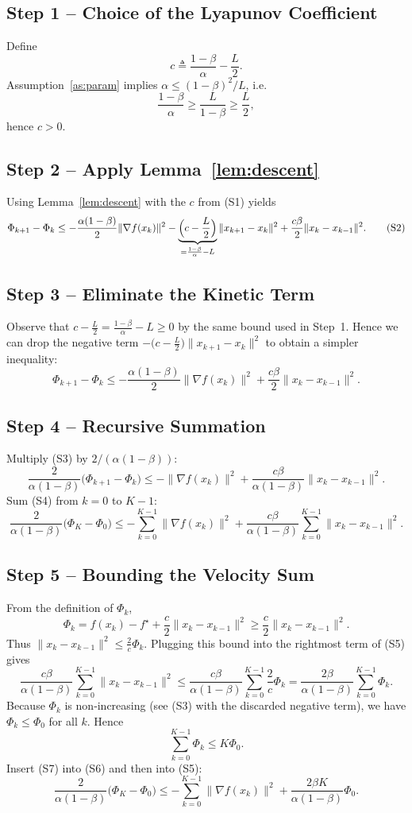 \documentclass{article}
\newcommand{\grad}{\nabla}
\begin{document}
\subsection*{Step 1 – Choice of the Lyapunov Coefficient}
Define
\[
c\triangleq\frac{1-\beta}{\alpha}-\frac{L}{2}.
\tag{S1}
\]
Assumption~\ref{as:param} implies $\alpha\le (1-\beta)^2/L$, i.e.
\[
\frac{1-\beta}{\alpha}\ge\frac{L}{1-\beta}\ge\frac{L}{2},
\]
hence $c>0$.

\subsection*{Step 2 – Apply Lemma~\ref{lem:descent}}
Using Lemma~\ref{lem:descent} with the $c$ from (S1) yields
\[
\Phi_{k+1}-\Phi_k
\le -\frac{\alpha(1-\beta)}{2}\|\grad f(x_k)\|^2
-\underbrace{\Bigl(c-\frac{L}{2}\Bigr)}_{=\frac{1-\beta}{\alpha}-L}\|x_{k+1}-x_k\|^2
+\frac{c\beta}{2}\|x_k-x_{k-1}\|^2 .
\tag{S2}
\]

\subsection*{Step 3 – Eliminate the Kinetic Term}
Observe that $c-\frac{L}{2} = \frac{1-\beta}{\alpha}-L\ge 0$ by the same bound used in Step~1. Hence we can drop the negative term $-\bigl(c-\frac{L}{2}\bigr)\|x_{k+1}-x_k\|^2$ to obtain a simpler inequality:
\[
\Phi_{k+1}-\Phi_k
\le -\frac{\alpha(1-\beta)}{2}\|\grad f(x_k)\|^2
+\frac{c\beta}{2}\|x_k-x_{k-1}\|^2 .
\tag{S3}
\]

\subsection*{Step 4 – Recursive Summation}
Multiply (S3) by $2/(\alpha(1-\beta))$:
\[
\frac{2}{\alpha(1-\beta)}\bigl(\Phi_{k+1}-\Phi_k\bigr)
\le -\|\grad f(x_k)\|^2
+\frac{c\beta}{\alpha(1-\beta)}\|x_k-x_{k-1}\|^2 .
\tag{S4}
\]
Sum (S4) from $k=0$ to $K-1$:
\[
\frac{2}{\alpha(1-\beta)}\bigl(\Phi_{K}-\Phi_{0}\bigr)
\le -\sum_{k=0}^{K-1}\|\grad f(x_k)\|^2
+\frac{c\beta}{\alpha(1-\beta)}\sum_{k=0}^{K-1}\|x_k-x_{k-1}\|^2 .
\tag{S5}
\]

\subsection*{Step 5 – Bounding the Velocity Sum}
From the definition of $\Phi_k$,
\[
\Phi_k = f(x_k)-f^\star+\frac{c}{2}\|x_k-x_{k-1}\|^2 \ge \frac{c}{2}\|x_k-x_{k-1}\|^2 .
\]
Thus $\|x_k-x_{k-1}\|^2 \le \frac{2}{c}\Phi_k$. Plugging this bound into the rightmost term of (S5) gives
\[
\frac{c\beta}{\alpha(1-\beta)}\sum_{k=0}^{K-1}\|x_k-x_{k-1}\|^2
\le
\frac{c\beta}{\alpha(1-\beta)}\sum_{k=0}^{K-1}\frac{2}{c}\Phi_k
=
\frac{2\beta}{\alpha(1-\beta)}\sum_{k=0}^{K-1}\Phi_k .
\tag{S6}
\]
Because $\Phi_k$ is non‑increasing (see (S3) with the discarded negative term), we have $\Phi_k\le\Phi_0$ for all $k$. Hence
\[
\sum_{k=0}^{K-1}\Phi_k \le K\Phi_0 .
\tag{S7}
\]
Insert (S7) into (S6) and then into (S5):
\[
\frac{2}{\alpha(1-\beta)}\bigl(\Phi_{K}-\Phi_{0}\bigr)
\le -\sum_{k=0}^{K-1}\|\grad f(x_k)\|^2
+\frac{2\beta K}{\alpha(1-\beta)}\Phi_0 .
\tag{S8}
\]
\end{document}
